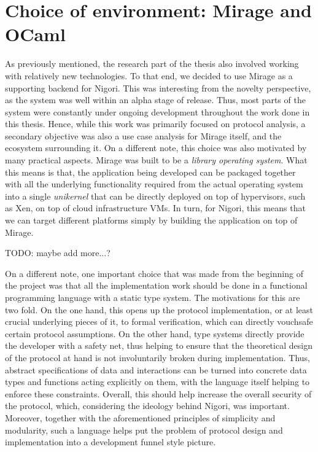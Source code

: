 \section{Choice of environment: Mirage and OCaml}
As previously mentioned, the research part of the thesis also involved working with relatively new technologies.
To that end, we decided to use Mirage as a supporting backend for Nigori.
This was interesting from the novelty perspective, as the system was well within an alpha stage of release.
Thus, most parts of the system were constantly under ongoing development throughout the work done in this thesis.
Hence, while this work was primarily focused on protocol analysis, a secondary objective was also a use case analysis for Mirage itself, and the ecosystem surrounding it.
On a different note, this choice was also motivated by many practical aspects.
Mirage was built to be a \textit{library operating system}.
What this means is that, the application being developed can be packaged together with all the underlying functionality required from the actual operating system into a single \textit{unikernel} that can be directly deployed on top of hypervisors, such as Xen, on top of cloud infrastructure VMs.
In turn, for Nigori, this means that we can target different platforms simply by building the application on top of Mirage.

TODO: maybe add more...?

On a different note, one important choice that was made from the beginning of the project was that all the implementation work should be done in a functional programming language with a static type system.
The motivations for this are two fold.
On the one hand, this opens up the protocol implementation, or at least crucial underlying pieces of it, to formal verification, which can directly vouchsafe certain protocol assumptions.
On the other hand, type systems directly provide the developer with a safety net, thus helping to ensure that the theoretical design of the protocol at hand is not involuntarily broken during implementation.
Thus, abstract specifications of data and interactions can be turned into concrete data types and functions acting explicitly on them, with the language itself helping to enforce these constraints.
Overall, this should help increase the overall security of the protocol, which, considering the ideology behind Nigori, was important.
Moreover, together with the aforementioned principles of simplicity and modularity, such a language helps put the problem of protocol design and implementation into a development funnel style picture.

